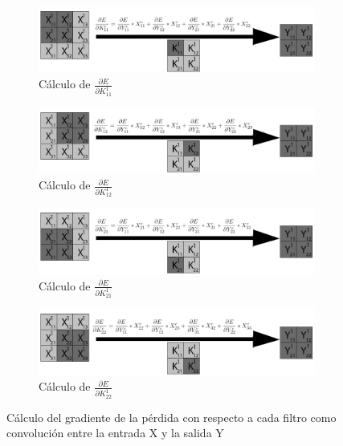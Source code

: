 \begin{figure}[H]
	\centering
	\begin{subfigure}{.5\textwidth}
		\hspace{-25mm}
		\includegraphics[width=1.4\linewidth]{imagenes/conv_backprop_1.jpg}  
		\caption{Cálculo de $\frac{\partial E}{\partial K^1_{11}}$}
	\end{subfigure}%
	\begin{subfigure}{.5\textwidth}
		\hspace{5mm}
		\includegraphics[width=1.4\linewidth]{imagenes/conv_backprop_2.jpg}  
		\caption{Cálculo de $\frac{\partial E}{\partial K^1_{12}}$}
	\end{subfigure}
	\vspace{5mm}
	\begin{subfigure}{.5\textwidth}
		\hspace{-25mm}
		\includegraphics[width=1.4\linewidth]{imagenes/conv_backprop_3.jpg}  
		\caption{Cálculo de $\frac{\partial E}{\partial K^1_{21}}$}
	\end{subfigure}%
	\begin{subfigure}{.5\textwidth}
		\hspace{5mm}
		\includegraphics[width=1.4\linewidth]{imagenes/conv_backprop_4.jpg}  
		\caption{Cálculo de $\frac{\partial E}{\partial K^1_{22}}$}
	\end{subfigure}
	\caption{Cálculo del gradiente de la pérdida con respecto a cada filtro como convolución entre la entrada X y la salida Y}
	\label{fig:conv_backprop_como_convolucion_X_Y}
\end{figure}

